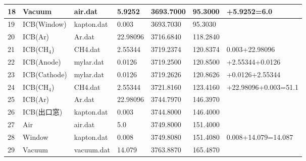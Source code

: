 \begin{table}
\begin{tabular}{lllllll}
    \cline{1-6}
    18 & Vacuum       & air.dat    & 5.9252 & 3693.7000 & 95.3000 & +5.9252=6.0 \\
    \hline
    19 & ICB(Window)     & kapton.dat & 0.003  & 3693.7030 & 95.3030& \\
    20 & ICB(Ar)       & Ar.dat     &22.98096& 3716.6840 & 118.2840 & \\
    21 & ICB(CH$_4$)     & CH4.dat    &2.55344 & 3719.2374 & 120.8374 & 0.003+22.98096 \\
    22 & ICB(Anode)     & mylar.dat  & 0.0126 & 3719.2500 & 120.8500 & +2.55344+0.0126 \\
    23 & ICB(Cathode)     & mylar.dat  & 0.0126 & 3719.2626 & 120.8626 & +0.0126+2.55344 \\
    24 & ICB(CH$_4$)    & CH4.dat    &2.55344 & 3721.8160 & 123.4160 & +22.98096+0.003=51.1 \\
    25 & ICB(Ar)       & Ar.dat     &22.98096& 3744.7970 & 146.3970 & \\
    26 & ICB(出口窓)     & kapton.dat & 0.003  & 3744.8000 & 146.4000& \\
    \hline
    27 & Air         & air.dat    & 5.0    & 3749.8000 & 151.4000 & \\
    \hline
    28 &Window     & kapton.dat & 0.008  & 3749.8080 & 151.4080 &
    0.008+14.079=14.087 \\
    29 &Vacuum         & vacuum.dat & 14.079 & 3763.8870 & 165.4870 & \\
    \hline
    \end{tabular}
\end{table}


